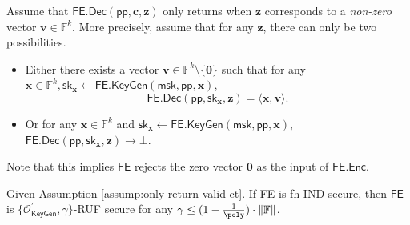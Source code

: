\begin{assumption}
\label{assump:only-return-valid-ct}
Assume that $\textsf{FE.Dec}(\textsf{pp}, \mathbf{c}, \mathbf{z})$ only returns when $\mathbf{z}$ corresponds to a \emph{non-zero} vector $\mathbf{v} \in \mathbb{F}^k$. More precisely, assume that for any $\mathbf{z}$, there can only be two possibilities.

\begin{itemize}
	\item Either there exists a vector $\mathbf{v} \in \mathbb{F}^k \setminus \{\mathbf{0}\}$ such that for any $\mathbf{x} \in \mathbb{F}^k, \textsf{sk}_{\mathbf{x}} \gets \textsf{FE.KeyGen}(\textsf{msk}, \textsf{pp}, \mathbf{x})$, 
	\[
		\textsf{FE.Dec}(\textsf{pp}, \textsf{sk}_{\mathbf{x}}, \mathbf{z}) = \langle \mathbf{x}, \mathbf{v} \rangle.
	\]
	\item Or for any $\mathbf{x} \in \mathbb{F}^k$ and $\textsf{sk}_{\mathbf{x}} \gets \textsf{FE.KeyGen}(\textsf{msk}, \textsf{pp}, \mathbf{x})$, $\textsf{FE.Dec}(\textsf{pp}, \textsf{sk}_{\mathbf{x}}, \mathbf{z}) \to \bot$.

\end{itemize}
Note that this implies $\textsf{FE}$ rejects the zero vector $\mathbf{0}$ as the input of $\textsf{FE.Enc}$.
\end{assumption}

\begin{theorem}
\label{thm:fh-IPFE:ind-OKeyGen-gamma-ruf}
Given Assumption \ref{assump:only-return-valid-ct}. If \textsf{FE} is fh-IND secure, then $\textsf{FE}$ is $\{ \mathcal{O}^\prime_{\textsf{KeyGen}}, \gamma \}$-RUF secure for any $\gamma \leq (1 - \frac{1}{\poly}) \cdot \|\mathbb{F}\|$.

\end{theorem}

